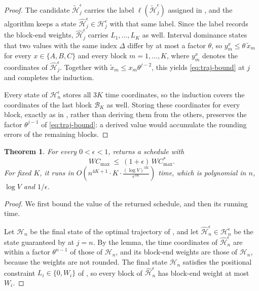 \documentclass[12pt]{article}
\newtheorem{theorem}{Theorem}[section]
\begin{document}
\begin{sloppypar}
\begin{proof}
            The candidate $\tilde{\mathscr{H}}^{\epsilon}_{j}$ carries the label
            $\ell(\tilde{\mathscr{H}}^{\epsilon}_{j})$ assigned in , and the algorithm
            keeps a state $\hat{\mathscr{H}}^{\epsilon}_{j}\in\mathscr{H}^{\epsilon}_{j}$ with that same label.
            Since the label records the block-end weights, $\hat{\mathscr{H}}^{\epsilon}_{j}$ carries
            $L_1,\dots,L_K$ as well. Interval dominance states that two values with the same index $\Delta$
            differ by at most a factor $\theta$, so $y^{x}_{m}\le\theta\,\tilde x_{m}$ for every
            $x\in\{A,B,C\}$ and every block $m=1,\dots,K$, where $y^{x}_{m}$ denotes the coordinates of
            $\hat{\mathscr{H}}^{\epsilon}_{j}$. Together with $\tilde x_m\le x_m\theta^{j-2}$, this yields
            \cref{eq:traj-bound} at $j$ and completes the induction.
            
            Every state of $\mathscr{H}^{\epsilon}_n$ stores all $3K$ time coordinates, so the induction covers
            the coordinates of the last block $\mathcal{B}_K$ as well. Storing these coordinates for every
            block, exactly as in , rather than deriving them from the others, preserves
            the factor $\theta^{j-1}$ of \cref{eq:traj-bound}: a derived value would accumulate the rounding
            errors of the remaining blocks.
        \end{proof}
        
        \begin{theorem}\label{thm:fptas}
            For every $0<\epsilon<1$,  returns a schedule with
            \[
            W C_{\max}\ \le\ (1+\epsilon)\,W C_{\max}^{*}.
            \]
            For fixed $K$, it runs in
            $
            O\!\left(n^{4K+1}\cdot K\cdot\frac{(\log V)^{3K}}{\epsilon^{3K}}\right)
            $
            time, which is polynomial in $n$, $\log V$ and $1/\epsilon$.
        \end{theorem}
        
        \begin{proof}
            We first bound the value of the returned schedule, and then its running time.
            
            Let $\mathscr{H}_{n}$ be the final state of the optimal trajectory of , and let
            $\hat{\mathscr{H}}^{\epsilon}_{n}\in\mathscr{H}^{\epsilon}_{n}$ be the state guaranteed by
             at $j=n$. By the lemma, the time coordinates of
            $\hat{\mathscr{H}}^{\epsilon}_{n}$ are within a factor $\theta^{n-1}$ of those of $\mathscr{H}_{n}$,
            and its block-end weights are those of $\mathscr{H}_{n}$, because the weights are not rounded. The
            final state $\mathscr{H}_{n}$ satisfies the positional constraint $L_i\in\{0,W_i\}$ of
            , so every block of $\hat{\mathscr{H}}^{\epsilon}_{n}$ has block-end weight at
            most $W_i$.
            

\end{proof}
\end{sloppypar}
\end{document}
